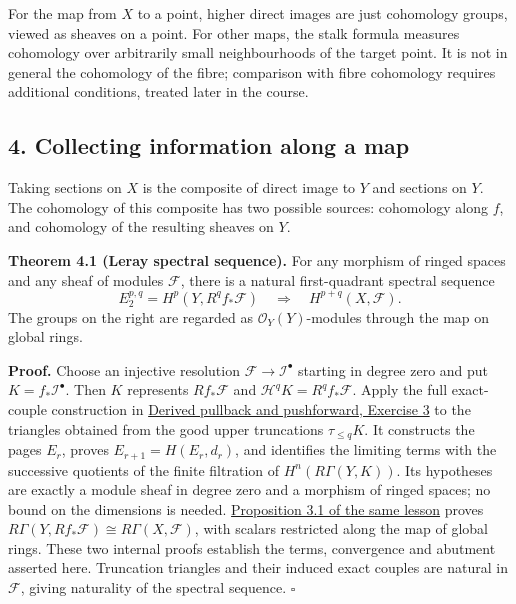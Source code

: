 \documentclass[11pt]{article}
\begin{document}
For the map from \(X\) to a point, higher direct images are just
cohomology groups, viewed as sheaves on a point. For other maps, the
stalk formula measures cohomology over arbitrarily small neighbourhoods
of the target point. It is not in general the cohomology of the fibre;
comparison with fibre cohomology requires additional conditions, treated
later in the course.

\subsection{4. Collecting information along a
map}\label{collecting-information-along-a-map}

Taking sections on \(X\) is the composite of direct image to \(Y\) and
sections on \(Y\). The cohomology of this composite has two possible
sources: cohomology along \(f\), and cohomology of the resulting sheaves
on \(Y\).

\textbf{Theorem 4.1 (Leray spectral sequence).} For any morphism of
ringed spaces and any sheaf of modules \(\mathcal F\), there is a
natural first-quadrant spectral sequence \[
E_2^{p,q}=H^p(Y,R^qf_*\mathcal F)
\quad\Longrightarrow\quad H^{p+q}(X,\mathcal F).
\] The groups on the right are regarded as \(\mathcal O_Y(Y)\)-modules
through the map on global rings.

\textbf{Proof.} Choose an injective resolution
\(\mathcal F\to\mathcal I^\bullet\) starting in degree zero and put
\(K=f_*\mathcal I^\bullet\). Then \(K\) represents \(Rf_*\mathcal F\)
and \(\mathcal H^qK=R^qf_*\mathcal F\). Apply the full exact-couple
construction in
\href{../derived-categories-and-sheaf-operations/derived-pullback-and-pushforward.html\#6-exercises-with-checked-solutions}{Derived
pullback and pushforward, Exercise 3} to the triangles obtained from the
good upper truncations \(\tau_{\le q}K\). It constructs the pages
\(E_r\), proves \(E_{r+1}=H(E_r,d_r)\), and identifies the limiting
terms with the successive quotients of the finite filtration of
\(H^n(R\Gamma(Y,K))\). Its hypotheses are exactly a module sheaf in
degree zero and a morphism of ringed spaces; no bound on the dimensions
is needed.
\href{../derived-categories-and-sheaf-operations/derived-pullback-and-pushforward.html\#3-composition-leray-and-the-local-descriptions}{Proposition
3.1 of the same lesson} proves
\(R\Gamma(Y,Rf_*\mathcal F)\cong R\Gamma(X,\mathcal F)\), with scalars
restricted along the map of global rings. These two internal proofs
establish the terms, convergence and abutment asserted here. Truncation
triangles and their induced exact couples are natural in \(\mathcal F\),
giving naturality of the spectral sequence. \(\square\)
\end{document}
